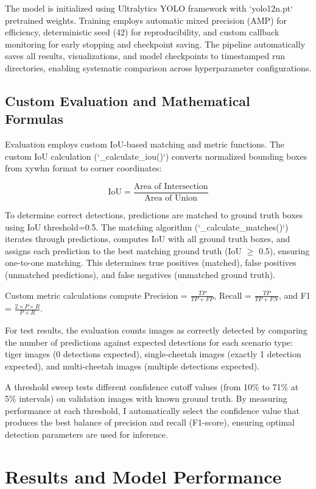 \documentclass[conference]{IEEEtran}
\begin{document}
The model is initialized using Ultralytics YOLO framework with `yolo12n.pt` pretrained weights. Training employs automatic mixed precision (AMP) for efficiency, deterministic seed (42) for reproducibility, and custom callback monitoring for early stopping and checkpoint saving. The pipeline automatically saves all results, visualizations, and model checkpoints to timestamped run directories, enabling systematic comparison across hyperparameter configurations.

\subsection{Custom Evaluation and Mathematical Formulas}

Evaluation employs custom IoU-based matching and metric functions. The custom IoU calculation (`\_calculate\_iou()`) converts normalized bounding boxes from xywhn format to corner coordinates:

$$\text{IoU} = \frac{\text{Area of Intersection}}{\text{Area of Union}}$$

To determine correct detections, predictions are matched to ground truth boxes using IoU threshold=0.5. The matching algorithm (`\_calculate\_matches()`) iterates through predictions, computes IoU with all ground truth boxes, and assigns each prediction to the best matching ground truth (IoU $\geq$ 0.5), ensuring one-to-one matching. This determines true positives (matched), false positives (unmatched predictions), and false negatives (unmatched ground truth).

Custom metric calculations compute Precision = $\frac{TP}{TP + FP}$, Recall = $\frac{TP}{TP + FN}$, and F1 = $\frac{2 \times P \times R}{P + R}$.

For test results, the evaluation counts images as correctly detected by comparing the number of predictions against expected detections for each scenario type: tiger images (0 detections expected), single-cheetah images (exactly 1 detection expected), and multi-cheetah images (multiple detections expected).

A threshold sweep tests different confidence cutoff values (from 10\% to 71\% at 5\% intervals) on validation images with known ground truth. By measuring performance at each threshold, I automatically select the confidence value that produces the best balance of precision and recall (F1-score), ensuring optimal detection parameters are used for inference.

\section{Results and Model Performance}
\end{document}
